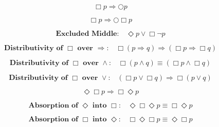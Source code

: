 \documentclass[fleqn, leqno]{article}
\newcommand{\next}{\bigcirc}
\newcommand{\event}{\Diamond}
\newcommand{\always}{\Box}
\newcommand{\spacer}{\vspace{-30pt}}
\begin{document}
\spacer

\begin{equation}\label{E:impAlwaysN}
\always p \Rightarrow \next p
\end{equation}

\spacer

\begin{equation}\label{E:impAlwaysNA}
\always p \Rightarrow \next\always p
\end{equation}

\spacer

\begin{equation}\label{E:excludedMid}
\textbf{Excluded Middle:}\quad \event p \lor \always\lnot p
\end{equation}

\spacer

\begin{equation}\label{E:distAlwaysImp}
\textbf{Distributivity of $\always$ over $\Rightarrow$:}\quad \always (p \Rightarrow q) \Rightarrow (\always p \Rightarrow \always q)
\end{equation}

\spacer

\begin{equation}\label{E:distAlwaysAnd}
\textbf{Distributivity of $\always$ over $\land$:}\quad \always (p \land q) \equiv (\always p \land \always q)
\end{equation}

\spacer

\begin{equation}\label{E:distAlwaysOr}
\textbf{Distributivity of $\always$ over $\lor$:}\quad (\always p \lor \always q) \Rightarrow \always (p \lor q)
\end{equation}

\spacer

\begin{equation}\label{E:eventAlwaysImp}
\event\always p \Rightarrow \always\event p
\end{equation}

\spacer

\begin{equation}\label{E:absEvent}
\textbf{Absorption of $\event$ into $\always$:}\quad \event\always\event p \equiv \always\event p
\end{equation}

\spacer

\begin{equation}\label{E:absAlways}
\textbf{Absorption of $\always$ into $\event$:}\quad \always\event\always p \equiv \event\always p
\end{equation}
\end{document}
